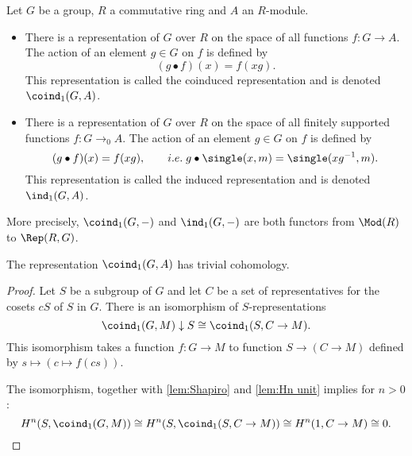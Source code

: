 \begin{definition} \label{def:induced}
	\leanok
	Let $G$ be a group, $R$ a commutative ring and $A$ an $R$-module.
	\begin{itemize}
		\item
		There is a representation of $G$ over $R$
		on the space of all functions $f : G \to A$. The action of an element $g \in G$ on $f$
		is defined by
		\[
			(g \bullet f) (x) = f(xg).
		\]
		This representation is called the coinduced representation and is denoted $\coind_1(G,A)$.
		\item
		There is a representation of $G$ over $R$
		on the space of all finitely supported functions $f : G \to_0 A$.
		The action of an element $g \in G$ on $f$ is defined by
		\[
			(g \bullet f) (x) = f(xg), \qquad i.e.\;
			g \bullet \single(x,m) = \single(xg^{-1},m).
		\]
		This representation is called the induced representation and is denoted $\ind_1(G,A)$.
	\end{itemize}
	More precisely, $\coind_1(G,-)$ and $\ind_1(G,-)$ are both functors from $\Mod(R)$ to $\Rep(R,G)$.
\end{definition}

\begin{lemma}	\label{lem:coind₁ trivial cohomology}
	\leanok
	The representation $\coind_1(G,A)$ has trivial cohomology.
\end{lemma}

\begin{proof}
	\leanok
	Let $S$ be a subgroup of $G$ and let $C$ be a set of representatives for the cosets $cS$
	of $S$ in $G$.
	There is an isomorphism of $S$-representations
	\[
		\coind_1(G,M) \downarrow S
		\cong
		\coind_1(S,C \to M).
	\]
	This isomorphism takes a function $f : G \to M$ to function $S \to (C \to M)$
	defined by $s \mapsto (c \mapsto f(cs))$.

	The isomorphism, together with \ref{lem:Shapiro} and \ref{lem:Hn unit} implies for $n >0$:
	\[
		H^n(S,\coind_1(G,M)) \cong
		H^n(S,\coind_1(S,C \to M)) \cong
		H^n(1,C \to M) \cong 0.
	\]
\end{proof}




